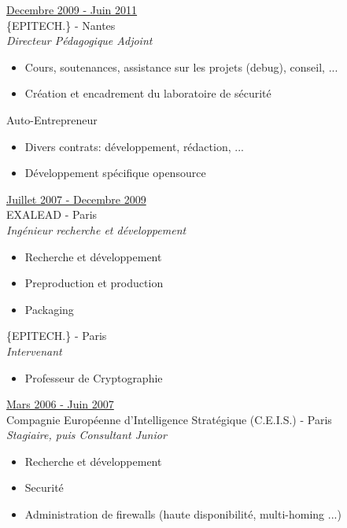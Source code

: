 \documentclass[a4paper,10pt]{letter}
\begin{document}
\begin{description}
\item{\underline{Decembre 2009 - Juin 2011}}\\
  \{EPITECH.\} - Nantes\\
  \textit{Directeur P\'edagogique Adjoint}
  \begin{itemize}
  \item Cours, soutenances, assistance sur les projets (debug), conseil, ...
  \item Cr\'eation et encadrement du laboratoire de s\'ecurit\'e\\
  \end{itemize}

  Auto-Entrepreneur
  \begin{itemize}
  \item Divers contrats: d\'eveloppement,
    r\'edaction, ...
  \item D\'eveloppement sp\'ecifique opensource\\
  \end{itemize}

\item{\underline{Juillet 2007 - Decembre 2009}}\\
  EXALEAD - Paris\\
  \textit{Ing\'enieur recherche et d\'eveloppement}
  \begin{itemize}
  \item Recherche et d\'eveloppement
  \item Preproduction et production
  \item Packaging\\
  \end{itemize}

  \{EPITECH.\} - Paris\\
  \textit{Intervenant}
  \begin{itemize}
  \item Professeur de Cryptographie\\
  \end{itemize}

\item{\underline{Mars 2006 - Juin 2007}} \\
  Compagnie Europ\'eenne d'Intelligence Strat\'egique (C.E.I.S.) - Paris\\
  \textit{Stagiaire, puis Consultant Junior}
  \begin{itemize}
  \item Recherche et d\'eveloppement
  \item Securit\'e
  \item Administration de firewalls (haute disponibilit\'e, multi-homing ...)\\
  \end{itemize}
\end{description}
\end{document}
